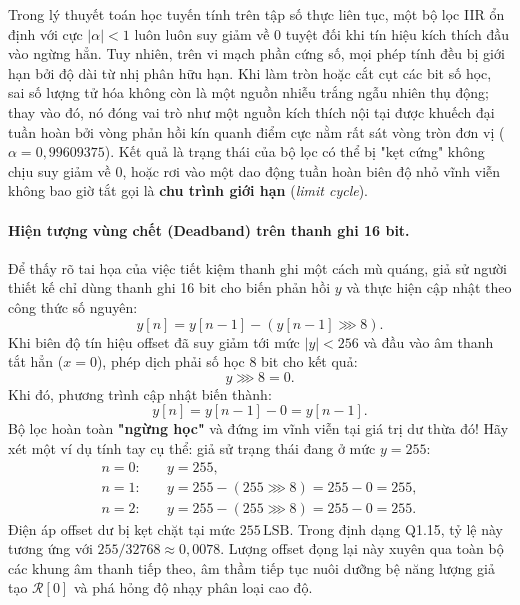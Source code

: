 \begin{physicalinsight}
Trong lý thuyết toán học tuyến tính trên tập số thực liên tục, một bộ lọc IIR ổn định với cực $|\alpha| < 1$ luôn luôn suy giảm về 0 tuyệt đối khi tín hiệu kích thích đầu vào ngừng hẳn. Tuy nhiên, trên vi mạch phần cứng số, mọi phép tính đều bị giới hạn bởi độ dài từ nhị phân hữu hạn. Khi làm tròn hoặc cắt cụt các bit số học, sai số lượng tử hóa không còn là một nguồn nhiễu trắng ngẫu nhiên thụ động; thay vào đó, nó đóng vai trò như một nguồn kích thích nội tại được khuếch đại tuần hoàn bởi vòng phản hồi kín quanh điểm cực nằm rất sát vòng tròn đơn vị ($\alpha = 0{,}99609375$). Kết quả là trạng thái của bộ lọc có thể bị "kẹt cứng" không chịu suy giảm về 0, hoặc rơi vào một dao động tuần hoàn biên độ nhỏ vĩnh viễn không bao giờ tắt gọi là \textbf{chu trình giới hạn} (\emph{limit cycle}).
\end{physicalinsight}

\paragraph{Hiện tượng vùng chết (Deadband) trên thanh ghi 16 bit.}
Để thấy rõ tai họa của việc tiết kiệm thanh ghi một cách mù quáng, giả sử người thiết kế chỉ dùng thanh ghi 16 bit cho biến phản hồi $y$ và thực hiện cập nhật theo công thức số nguyên:
\begin{equation}
y[n] = y[n-1] - (y[n-1] \ggg 8).
\end{equation}
Khi biên độ tín hiệu offset đã suy giảm tới mức $|y| < 256$ và đầu vào âm thanh tắt hẳn ($x = 0$), phép dịch phải số học $8$ bit cho kết quả:
\begin{equation}
y \ggg 8 = 0.
\end{equation}
Khi đó, phương trình cập nhật biến thành:
\begin{equation}
y[n] = y[n-1] - 0 = y[n-1].
\end{equation}
Bộ lọc hoàn toàn \textbf{"ngừng học"} và đứng im vĩnh viễn tại giá trị dư thừa đó! Hãy xét một ví dụ tính tay cụ thể: giả sử trạng thái đang ở mức $y = 255$:
\begin{align*}
n = 0: & \quad y = 255,\\
n = 1: & \quad y = 255 - (255 \ggg 8) = 255 - 0 = 255,\\
n = 2: & \quad y = 255 - (255 \ggg 8) = 255 - 0 = 255.
\end{align*}
Điện áp offset dư bị kẹt chặt tại mức $255\,\text{LSB}$. Trong định dạng Q1.15, tỷ lệ này tương ứng với $255 / 32768 \approx 0{,}0078$. Lượng offset đọng lại này xuyên qua toàn bộ các khung âm thanh tiếp theo, âm thầm tiếp tục nuôi dưỡng bệ năng lượng giả tạo $\mathcal{R}[0]$ và phá hỏng độ nhạy phân loại cao độ.

